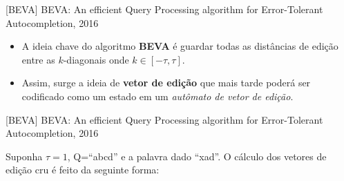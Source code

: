 \documentclass[11pt]{beamer}
\begin{document}
\begin{frame}{[BEVA] BEVA: An efficient Query Processing algorithm for Error-Tolerant Autocompletion, 2016}

    \begin{itemize}
        \item A ideia chave do algoritmo \textbf{BEVA} é guardar todas as distâncias de edição entre as $k$-diagonais onde $k \in [-\tau, \tau]$.
        \item Assim, surge a ideia de \textbf{vetor de edição} que mais tarde poderá ser codificado como um estado em um \textit{autômato de vetor de edição}. 
    \end{itemize}

\end{frame}

\begin{frame}{[BEVA] BEVA: An efficient Query Processing algorithm for Error-Tolerant Autocompletion, 2016}

    Suponha $\tau = 1$, Q=``abcd'' e a palavra dado ``xad''. O cálculo dos vetores de edição cru é feito da seguinte forma:
  

\end{frame}
\end{document}
